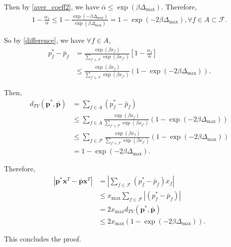 \documentclass[10pt,conference]{IEEEtran}
\begin{document}
Then by \eqref{aver_coeff2}, we have $\bar{\alpha} \le \exp(\beta
\Delta_{\max})$. Therefore,
\begin{align}
1-\frac{\alpha_{f}}{\bar{\alpha}} \le 1-\frac{\exp(- \beta
\Delta_{\max})}{\exp(\beta\Delta_{\max})} = 1- \exp(-2 \beta
\Delta_{\max}) , \forall f \in A \subset \mathcal{F}.
\end{align}

So by \eqref{difference}, we have $\forall f \in A$,
\begin{align}
p^*_f - \bar{p}_f & = \frac{\exp(\beta x_{f})}{\sum\limits_{f' \in
\mathcal{F}} \exp(\beta x_{f'})} [1-\frac{\alpha_{f}}{\bar{\alpha}}]
\\ & \le \frac{\exp(\beta x_{f})}{\sum\limits_{f' \in
\mathcal{F}} \exp(\beta x_{f'})} (1-\exp(-2 \beta \Delta_{\max})).
\end{align}

Then,
\begin{align}
d_{TV}(\boldsymbol{p^*}, \boldsymbol{\bar{p}})& = \sum\limits_{f \in
A} (p^*_f -\bar{p}_f) \\ & \le \sum\limits_{f \in A}
\frac{\exp(\beta x_{f})}{\sum\limits_{f' \in \mathcal{F}} \exp(\beta
x_{f'})} (1-\exp(-2 \beta \Delta_{\max})) \\ & \le \sum\limits_{f
\in \mathcal{F}} \frac{\exp(\beta x_{f})}{\sum\limits_{f' \in
\mathcal{F}} \exp(\beta x_{f'})} (1-\exp(-2 \beta \Delta_{\max})) \\
& = 1-\exp(-2 \beta \Delta_{\max}).
\end{align}

Therefore,
\begin{align}
|\boldsymbol{p^*} \boldsymbol{x}^T - \boldsymbol{\bar{p}}
\boldsymbol{x}^T| & = |\sum\limits_{f \in \mathcal{F}} (p^*_f
-\bar{p}_f)x_f | \\ & \le x_{\max} \sum\limits_{f \in \mathcal{F}}
|(p^*_f -\bar{p}_f)| \\ & = 2x_{\max}d_{TV}(\boldsymbol{p^*},
\boldsymbol{\bar{p}}) \\ & \le 2x_{\max}(1-\exp(-2 \beta
\Delta_{\max})).
\end{align}

This concludes the proof.
\end{document}
